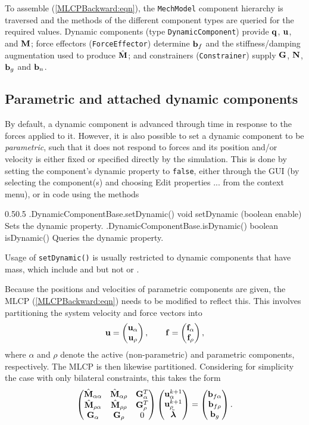 To assemble (\ref{MLCPBackward:eqn}), the {\tt MechModel} component hierarchy is
traversed and the methods of the different component types are queried for the
required values.  Dynamic components (type {\tt DynamicComponent}) provide
${\bf q}$, ${\bf u}$, and ${\bf M}$; force effectors ({\tt ForceEffector}) determine ${\bf b}_f$
and the stiffness/damping augmentation used to produce $\hat{{\bf M}}$; and constrainers
({\tt Constrainer}) supply ${\bf G}$, ${\bf N}$, ${\bf b}_g$ and ${\bf b}_n$.

\subsection{Parametric and attached dynamic components}
\label{ParametricAndAttached:sec}

By default, a dynamic component is advanced through time in response to the
forces applied to it. However, it is also possible to set a dynamic component
to be {\it parametric}, such that it does not respond to forces and its
position and/or velocity is either fixed or specified directly by the
simulation. This is done by setting the component's {\sf dynamic} property to
{\tt false}, either through the GUI (by selecting the component(s) and choosing
{\sf Edit properties ...} from the context menu), or in code using the methods
%
%
\begin{methodtable}{0.5}{0.5}
\midline
%
\methodentry
{\mech.DynamicComponentBase.setDynamic()}%
{void setDynamic (boolean enable)}%
{Sets the dynamic property.}%
%
\methodentry
{\mech.DynamicComponentBase.isDynamic()}%
{boolean isDynamic()}%
{Queries the dynamic property.}%
%
\midline
\end{methodtable}
%
\begin{sideblock}
Usage of {\tt setDynamic()} is usually restricted to dynamic components that
have mass, which include
 and
 but not
 or
.
\end{sideblock}
%
Because the positions and velocities of parametric components are given, the
MLCP (\ref{MLCPBackward:eqn}) needs to be modified to reflect this.  This
involves partitioning the system velocity and force vectors into
%
\begin{equation*}
{\bf u} = \left(\begin{matrix} {\bf u}_\alpha \\ {\bf u}_\rho \end{matrix}\right), \qquad
{\bf f} = \left(\begin{matrix} {\bf f}_{\alpha} \\ {\bf f}_{\rho} \end{matrix}\right),
\end{equation*}
%
where $\alpha$ and $\rho$ denote the active (non-parametric) and parametric
components, respectively. The MLCP is then likewise partitioned. Considering
for simplicity the case with only bilateral constraints, this takes the form
%
\begin{equation*}
\left(\begin{matrix} 
\hat{\bf M}_{\alpha\alpha} & \hat{\bf M}_{\alpha\rho} & {\bf G}_{\alpha}^T \\
\hat{\bf M}_{\rho\alpha} & \hat{\bf M}_{\rho\rho} & {\bf G}_{\rho}^T \\
{\bf G}_{\alpha} & {\bf G}_{\rho} & 0 \\
\end{matrix}\right)
\left(\begin{matrix} {\bf u}_\alpha^{k+1} \\ {\bf u}_\rho^{k+1} \\ \tilde{\boldsymbol\lambda} \end{matrix}\right) =
\left(\begin{matrix} 
{\bf b}_{f\alpha} \\ 
{\bf b}_{f\rho} \\
{\bf b}_g \end{matrix}\right).
\end{equation*}

